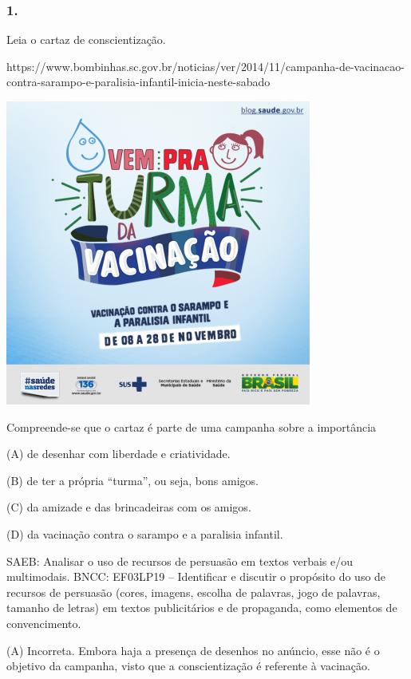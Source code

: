 \subsubsection{1.}\label{section-44}

Leia o cartaz de conscientização.

https://www.bombinhas.sc.gov.br/noticias/ver/2014/11/campanha-de-vacinacao-contra-sarampo-e-paralisia-infantil-inicia-neste-sabado

\includegraphics[width=3.95833in,height=3.95833in]{media/image12.png}


Compreende-se que o cartaz é parte de uma campanha sobre a importância

(A) de desenhar com liberdade e criatividade.

(B) de ter a própria ``turma'', ou seja, bons amigos.

(C) da amizade e das brincadeiras com os amigos.

(D) da vacinação contra o sarampo e a paralisia infantil.

SAEB: Analisar o uso de recursos de persuasão em textos verbais e/ou multimodais.
BNCC: EF03LP19 -- Identificar e discutir o propósito do uso de recursos de
persuasão (cores, imagens, escolha de palavras, jogo de palavras,
tamanho de letras) em textos publicitários e de propaganda, como
elementos de convencimento.

(A) Incorreta. Embora haja a presença de desenhos no anúncio, esse não é
o objetivo da campanha, visto que a conscientização é referente à
vacinação.

